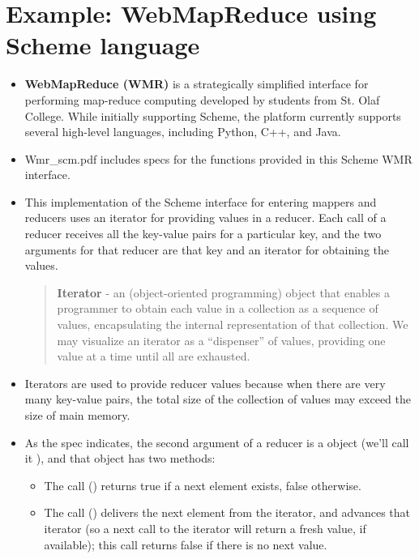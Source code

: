 \documentclass[letterpaper,10pt,openany,oneside]{sphinxmanual}
\begin{document}
\chapter{Example: WebMapReduce using Scheme language}
\label{SchemeLanguage/SchemeLanguage::doc}\label{SchemeLanguage/SchemeLanguage:example-webmapreduce-using-scheme-language}\begin{itemize}
\item {} 
\textbf{WebMapReduce (WMR)} is a strategically simplified interface for performing map-reduce computing developed by students from St. Olaf College.  While initially supporting Scheme, the platform currently supports several high-level languages, including Python, C++, and Java.

\item {} 
Wmr\_scm.pdf includes specs for the functions provided in this Scheme WMR interface. 

\item {} 
This implementation of the Scheme interface for entering mappers and reducers uses an iterator for providing values in a reducer. Each call of a reducer receives all the key-value pairs for a particular key, and the two arguments for that reducer are that key and an iterator for obtaining the values.
\begin{quote}

\textbf{Iterator} - an (object-oriented programming) object that enables a programmer to obtain each value in a collection as a sequence of values, encapsulating the internal representation of that collection.  We may visualize an iterator as a ``dispenser'' of values, providing one value at a time until all are exhausted.
\end{quote}

\item {} 
Iterators are used to provide reducer values because when there are very many key-value pairs, the total size of the collection of values may exceed the size of main memory.

\item {} 
As the spec indicates, the second argument of a reducer is a  object (we'll call it ), and that object  has two methods:
\begin{itemize}
\item {} 
The call () returns true if a next element exists, false otherwise.

\item {} 
The call () delivers the next element from the iterator, and advances that iterator (so a next call to the iterator will return a fresh value, if available); this call returns false if there is no next value.

\end{itemize}

\end{itemize}
\end{document}
